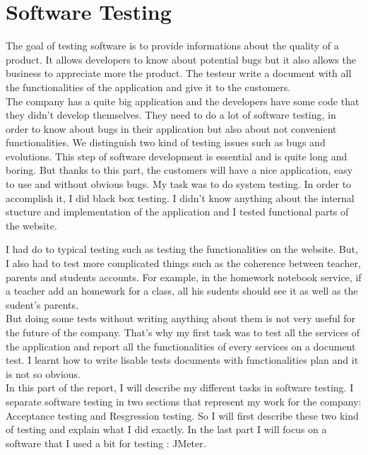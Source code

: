 
\section{Software Testing}

	The goal of testing software is to provide informations about the quality of a product. 
	It allows developers to know about potential bugs but it also allows the business 
	to appreciate more the product. The testeur write a document with all the 
	functionalities of the application and give it to the customers.\\  

The company has a quite big application and the developers have some code that they didn't develop
 themselves. They need to do a lot of software testing, in order to know about
bugs in their application but also about not convenient functionalities. We distinguish 
two kind of testing issues such as bugs and evolutions. 
This step of software development is essential and is quite
long and boring. But thanks to this part, the customers will have a nice application, 
easy to use and without obvious bugs. 
My task was to do system testing. In order to accomplish it, I did black box testing. 
I didn't know anything about the internal stucture and implementation of the application
and I tested functional parts of the website.

I had do to typical testing such as testing the functionalities on the website. 
But, I also had to test more complicated things such as the coherence between 
teacher, parents and students accounts. For example, in the homework notebook service, 
if a teacher add an homework for a class, all his sudents should see it as well as 
	the sudent's parents. \\



But doing some tests without writing anything about them is not very useful for the future 
of the company. That's why my first task was to test all the services of the application and report all the 
functionalities of every services on a document test. 
I learnt how to write lisable tests documents with functionalities plan and it is not so obvious. \\ 

In this part of the report, I will describe my different tasks in software testing. 
I separate software testing in two sections that represent my work for the company: 
Acceptance testing and Resgression testing. So I will first describe these two kind of 
testing and explain what I did exactly. 
In the last part I will focus on a software that I used a bit for testing : JMeter.  \\

